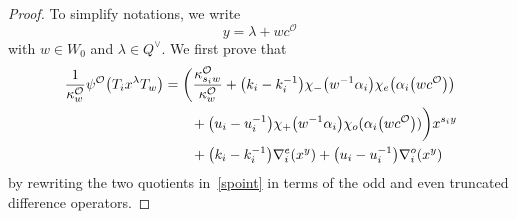 \begin{proof}
To simplify notations, we write
\[
y=\lambda+wc^\mathcal{O}
\]
with $w\in W_0$ and $\lambda\in Q^\vee$.
We first prove that
\begin{gather}
\frac{1}{\kappa_w^\mathcal{O}} \psi^\mathcal{O}\bigl(T_ix^\lambda T_w\bigr)
=\biggl(\frac{\kappa_{s_iw}^\mathcal{O}}{\kappa_w^\mathcal{O}}
+\bigl(k_i-k_i^{-1}\bigr)\chi_-\bigl(w^{-1}\alpha_i\bigr)\chi_e\bigl(\alpha_i\bigl(wc^\mathcal{O}\bigr)\bigr)\nonumber\\
\hphantom{\frac{1}{\kappa_w^\mathcal{O}} \psi^\mathcal{O}\bigl(T_ix^\lambda T_w\bigr)=\biggl(}{}
 +\bigl(u_i-u_i^{-1}\bigr)\chi_+\bigl(w^{-1}\alpha_i\bigr)\chi_o(\alpha_i\bigl(wc^\mathcal{O}\bigr))\biggr)x^{s_iy}\nonumber\\
 \hphantom{\frac{1}{\kappa_w^\mathcal{O}} \psi^\mathcal{O}\bigl(T_ix^\lambda T_w\bigr)=}{}
 +\bigl(k_i-k_i^{-1}\bigr)\nabla_i^e(x^y)+\bigl(u_i-u_i^{-1}\bigr)\nabla_i^o(x^y)
\label{formula}
\end{gather}
by rewriting the two quotients in~\eqref{spoint} in terms of the odd and even truncated difference operators.


\end{proof}
